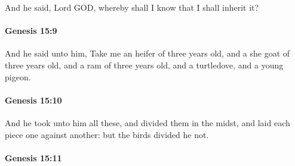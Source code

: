 			And he said, Lord GOD, whereby shall I know that I shall inherit it?


		\paragraph{Genesis 15:9} %
			\label{GENESIS-15-9}

			And he said unto him, Take me an heifer of three years old, and a she goat of three years old, and a ram of three years old, and a turtledove, and a young pigeon.


		\paragraph{Genesis 15:10} %
			\label{GENESIS-15-10}

			And he took unto him all these, and divided them in the midst, and laid each piece one against another: but the birds divided he not.


		\paragraph{Genesis 15:11} %
			\label{GENESIS-15-11}

